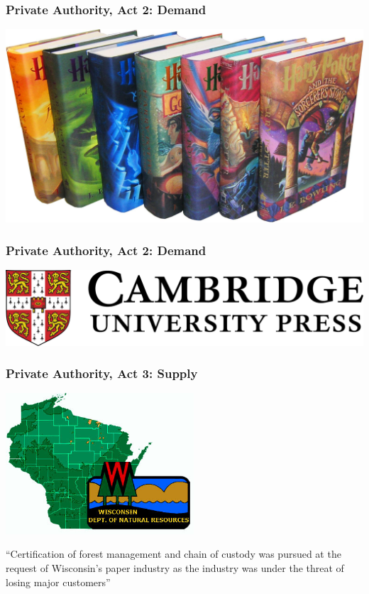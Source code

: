 \documentclass[10pt]{beamer}
\begin{document}
\begin{frame}
\frametitle{Private Authority, Act 2: Demand}
\includegraphics[width = \textwidth]{harrypotter}
\end{frame}

\begin{frame}
\frametitle{Private Authority, Act 2: Demand}
\includegraphics[width = \textwidth]{cambridge}
\end{frame}

\begin{frame}
\frametitle{Private Authority, Act 3: Supply}
\centering 
\includegraphics[width = 7cm]{dnr}

``Certification of forest management and chain of custody was pursued at the request of Wisconsin's paper industry as the industry was under the threat of losing major customers''
\end{frame}
\end{document}
